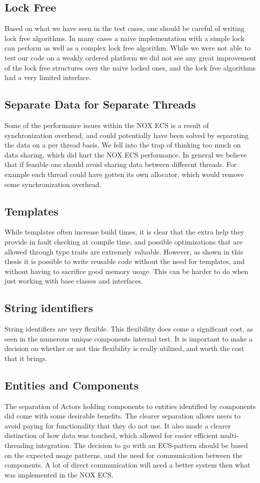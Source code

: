 \subsection{Lock Free}
Based on what we have seen in the test cases, one should be careful of writing lock free algorithms.
In many cases a naive implementation with a simple lock can perform as well as a complex lock free algorithm.
While we were not able to test our code on a weakly ordered platform we did not see any great improvement
of the lock free structures over the naive locked ones, and the lock free algorithms had a very limited interface.

\subsection{Separate Data for Separate Threads}
Some of the performance issues within the NOX ECS is a result of synchronization overhead,
and could potentially have been solved by separating the data on a per thread basis.
We fell into the trap of thinking too much on data sharing, which did hurt the NOX ECS performance.
In general we believe that if feasible one should avoid sharing data between different threads.
For example each thread could have gotten its own allocator, which would remove some synchronization overhead.

\subsection{Templates}
While templates often increase build times, it is clear that the extra help they provide in
fault checking at compile time, and possible optimizations that are allowed through type traits
are extremely valuable.
However, as shown in this thesis it is possible to write reusable code without the need for templates,
and without having to sacrifice good memory usage. This can be harder to do when just working with
base classes and interfaces.

\subsection{String identifiers}
String identifiers are very flexible. This flexibility does come a significant cost, as seen
in the numerous unique components internal test.
It is important to make a decision on whether or not this flexibility is really utilized, and worth
the cost that it brings.

\subsection{Entities and Components}
The separation of Actors holding components to entities identified by components did come with some
desirable benefits. The clearer separation allows users to avoid paying for functionality that they
do not use. It also made a clearer distinction of how data was touched, which allowed for easier efficient
multi-threading integration.
The decision to go with an ECS-pattern should be based on the expected usage patterns, and the
need for communication between the components.
A lot of direct communication will need a better system then what was implemented in the NOX ECS.

